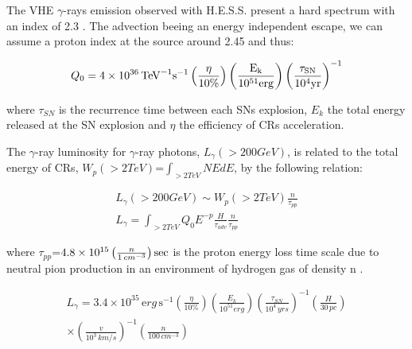 \documentclass[a4paper,fleqn,usenatbib]{mnras}
\begin{document}
The VHE $\gamma$-rays emission observed with H.E.S.S. present a hard spectrum with an index of 2.3 \citep{2006Natur.439..695A}. The advection beeing an energy independent escape, we can assume a proton index at the source around 2.45 and thus:
\begin{center}
\begin{eqnarray*}
Q_0=4\times 10^{36} \, \rm{TeV}^{-1} s^{-1} \left(\frac{\eta}{10\%}\right) \left(\frac{E_{k}}{10^{51}erg}\right) {\left(\frac{\tau_{SN}}{10^{4} yr}\right)}^{-1}
\label{steadystate2}
\end{eqnarray*}
\end{center} 
where $\tau_{SN}$ is the recurrence time between each SNs explosion, $E_{k}$ the total energy released at the SN explosion and $\eta$ the efficiency of CRs acceleration.

The $\gamma$-ray luminosity for $\gamma$-ray photons, $L_{\gamma}(>200 GeV)$, is related to the total energy of CRs, $W_{p}(>2 TeV)$=$\int_{>2 TeV} N E dE$, by the following relation:
\begin{center}
\begin{eqnarray*}
L_{\gamma}(>200 GeV) \sim W_{p}(>2 TeV) \frac{n}{\tau_{pp}} \\
L_{\gamma}=\int_{>2 TeV} Q_0 E^{-p} \frac{H}{\tau_{adv}} \frac{n}{\tau_{pp}}
\end{eqnarray*}
\end{center}

where $\tau_{pp}$=$4.8 \times 10^{15} \left( \frac{n}{1 \, cm^{-3}}\right) \rm sec$ is the proton energy loss time scale due to neutral pion production in an environment of hydrogen gas of density n \citep{2004vhec.book.....A}.

\begin{center}
\begin{multline}
L_{\gamma}=3.4\times 10^{35} \, \mathrm erg \, \mathrm s^{-1} \left(\frac{\eta}{10\%}\right) \left(\frac{E_{k}}{10^{51}erg}\right) {\left(\frac{\tau_{SN}}{10^{4} \, yrs}\right)}^{-1} \left(\frac{H}{30 \, pc}\right) \\ \times {\left(\frac{v}{10^{3} \, km/s}\right)}^{-1} \left(\frac{n}{100 \, cm^{-3}}\right)
\label{steadystate4}
\end{multline}
\end{center} 
\end{document}
